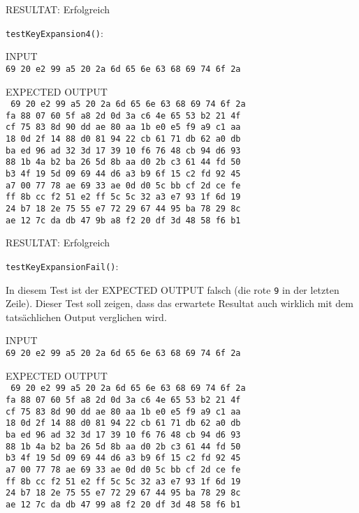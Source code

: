 \documentclass[12pt, letterpaper]{article}
\newcommand{\code}[1]{\texttt{#1}}
\begin{document}
RESULTAT: {\color{dgreen}Erfolgreich}

\code{testKeyExpansion4()}:

INPUT\\
\code{69 20 e2 99 a5 20 2a 6d 65 6e 63 68 69 74 6f 2a}

EXPECTED OUTPUT\\
\code{
69 20 e2 99 a5 20 2a 6d 65 6e 63 68 69 74 6f 2a\\
fa 88 07 60 5f a8 2d 0d 3a c6 4e 65 53 b2 21 4f\\
cf 75 83 8d 90 dd ae 80 aa 1b e0 e5 f9 a9 c1 aa\\
18 0d 2f 14 88 d0 81 94 22 cb 61 71 db 62 a0 db\\
ba ed 96 ad 32 3d 17 39 10 f6 76 48 cb 94 d6 93\\
88 1b 4a b2 ba 26 5d 8b aa d0 2b c3 61 44 fd 50\\
b3 4f 19 5d 09 69 44 d6 a3 b9 6f 15 c2 fd 92 45\\
a7 00 77 78 ae 69 33 ae 0d d0 5c bb cf 2d ce fe\\
ff 8b cc f2 51 e2 ff 5c 5c 32 a3 e7 93 1f 6d 19\\
24 b7 18 2e 75 55 e7 72 29 67 44 95 ba 78 29 8c\\
ae 12 7c da db 47 9b a8 f2 20 df 3d 48 58 f6 b1
}

RESULTAT: {\color{dgreen}Erfolgreich}

\newpage
\code{testKeyExpansionFail()}:

In diesem Test ist der EXPECTED OUTPUT falsch (die rote \code{{\color{red}9}} in der letzten Zeile). Dieser Test soll zeigen, dass das erwartete Resultat auch wirklich mit dem tatsächlichen Output verglichen wird.

INPUT\\
\code{69 20 e2 99 a5 20 2a 6d 65 6e 63 68 69 74 6f 2a}

EXPECTED OUTPUT\\
\code{
69 20 e2 99 a5 20 2a 6d 65 6e 63 68 69 74 6f 2a\\
fa 88 07 60 5f a8 2d 0d 3a c6 4e 65 53 b2 21 4f\\
cf 75 83 8d 90 dd ae 80 aa 1b e0 e5 f9 a9 c1 aa\\
18 0d 2f 14 88 d0 81 94 22 cb 61 71 db 62 a0 db\\
ba ed 96 ad 32 3d 17 39 10 f6 76 48 cb 94 d6 93\\
88 1b 4a b2 ba 26 5d 8b aa d0 2b c3 61 44 fd 50\\
b3 4f 19 5d 09 69 44 d6 a3 b9 6f 15 c2 fd 92 45\\
a7 00 77 78 ae 69 33 ae 0d d0 5c bb cf 2d ce fe\\
ff 8b cc f2 51 e2 ff 5c 5c 32 a3 e7 93 1f 6d 19\\
24 b7 18 2e 75 55 e7 72 29 67 44 95 ba 78 29 8c\\
ae 12 7c da db 47 9{\color{red}9} a8 f2 20 df 3d 48 58 f6 b1
}
\end{document}
